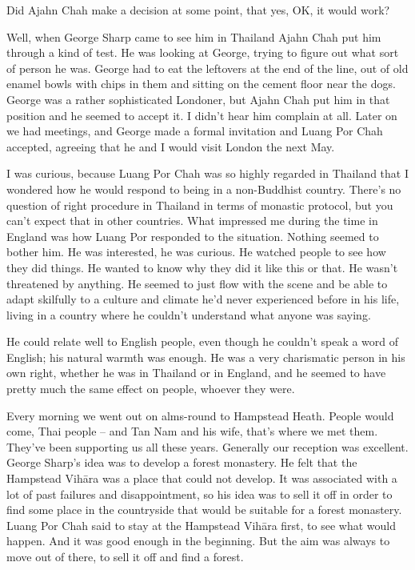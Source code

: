 \question{}
Did Ajahn Chah make a decision at some point, that yes, OK, it
would work? 

\answer{}
Well, when George Sharp came to see him in Thailand Ajahn Chah
put him through a kind of test. He was looking at George, trying to
figure out what sort of person he was. George had to eat the leftovers
at the end of the line, out of old enamel bowls with chips in them and
sitting on the cement floor near the dogs. George was a rather
sophisticated Londoner, but Ajahn Chah put him in that position and he
seemed to accept it. I didn't hear him complain at all. Later on we had
meetings, and George made a formal invitation and Luang Por Chah
accepted, agreeing that he and I would visit London the next May. 

I was curious, because Luang Por Chah was so highly regarded in Thailand
that I wondered how he would respond to being in a non-Buddhist country. 
There's no question of right procedure in Thailand in terms of monastic
protocol, but you can't expect that in other countries. What impressed
me during the time in England was how Luang Por responded to the
situation. Nothing seemed to bother him. He was interested, he was
curious. He watched people to see how they did things. He wanted to know
why they did it like this or that. He wasn't threatened by anything. He
seemed to just flow with the scene and be able to adapt skilfully to a
culture and climate he'd never experienced before in his life, living in
a country where he couldn't understand what anyone was saying. 

He could relate well to English people, even though he couldn't speak a
word of English; his natural warmth was enough. He was a very
charismatic person in his own right, whether he was in Thailand or in
England, and he seemed to have pretty much the same effect on people, 
whoever they were. 

Every morning we went out on alms-round to Hampstead Heath. People would
come, Thai people -- and Tan Nam and his wife, that's where we met them. 
They've been supporting us all these years. Generally our reception was
excellent. George Sharp's idea was to develop a forest monastery. He
felt that the Hampstead Vihāra was a place that could not develop. It
was associated with a lot of past failures and disappointment, so his
idea was to sell it off in order to find some place in the countryside
that would be suitable for a forest monastery. Luang Por Chah said to
stay at the Hampstead Vihāra first, to see what would happen. And it was
good enough in the beginning. But the aim was always to move out of
there, to sell it off and find a forest. 


